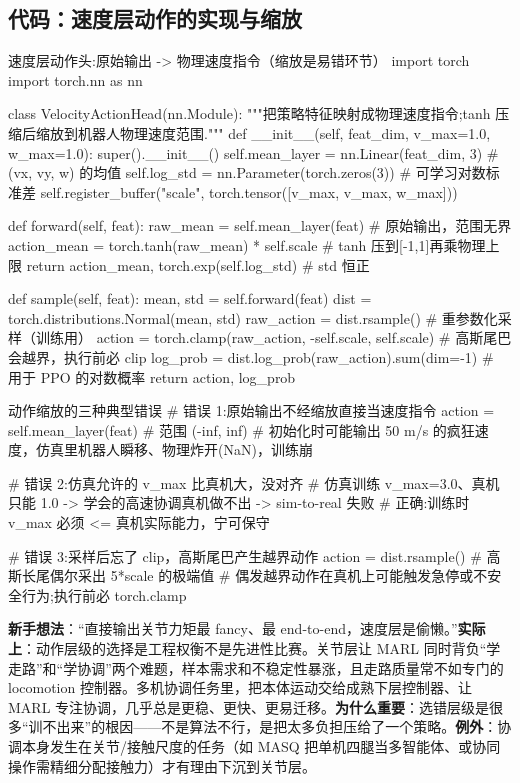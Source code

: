 \subsection{代码：速度层动作的实现与缩放}
\label{sec:mc-action-code}

\begin{codebox}[Python]{速度层动作头:原始输出 -> 物理速度指令（缩放是易错环节）}
import torch
import torch.nn as nn

class VelocityActionHead(nn.Module):
    """把策略特征映射成物理速度指令;tanh 压缩后缩放到机器人物理速度范围."""
    def __init__(self, feat_dim, v_max=1.0, w_max=1.0):
        super().__init__()
        self.mean_layer = nn.Linear(feat_dim, 3)             # (vx, vy, w) 的均值
        self.log_std = nn.Parameter(torch.zeros(3))          # 可学习对数标准差
        self.register_buffer("scale", torch.tensor([v_max, v_max, w_max]))

    def forward(self, feat):
        raw_mean = self.mean_layer(feat)                     # 原始输出，范围无界
        action_mean = torch.tanh(raw_mean) * self.scale      # tanh 压到[-1,1]再乘物理上限
        return action_mean, torch.exp(self.log_std)          # std 恒正

    def sample(self, feat):
        mean, std = self.forward(feat)
        dist = torch.distributions.Normal(mean, std)
        raw_action = dist.rsample()                           # 重参数化采样（训练用）
        action = torch.clamp(raw_action, -self.scale, self.scale)  # 高斯尾巴会越界，执行前必 clip
        log_prob = dist.log_prob(raw_action).sum(dim=-1)     # 用于 PPO 的对数概率
        return action, log_prob
\end{codebox}

\begin{codebox}[Python]{动作缩放的三种典型错误}
# 错误 1:原始输出不经缩放直接当速度指令
action = self.mean_layer(feat)        # 范围 (-inf, inf)
#   初始化时可能输出 50 m/s 的疯狂速度，仿真里机器人瞬移、物理炸开(NaN)，训练崩

# 错误 2:仿真允许的 v_max 比真机大，没对齐
#   仿真训练 v_max=3.0、真机只能 1.0 -> 学会的高速协调真机做不出 -> sim-to-real 失败
#   正确:训练时 v_max 必须 <= 真机实际能力，宁可保守

# 错误 3:采样后忘了 clip，高斯尾巴产生越界动作
action = dist.rsample()               # 高斯长尾偶尔采出 5*scale 的极端值
#   偶发越界动作在真机上可能触发急停或不安全行为;执行前必 torch.clamp
\end{codebox}

\begin{pitfall}
\textbf{新手想法}：“直接输出关节力矩最 fancy、最 end-to-end，速度层是偷懒。”\textbf{实际上}：动作层级的选择是工程权衡不是先进性比赛。关节层让 MARL 同时背负“学走路”和“学协调”两个难题，样本需求和不稳定性暴涨，且走路质量常不如专门的 locomotion 控制器。多机协调任务里，把本体运动交给成熟下层控制器、让 MARL 专注协调，几乎总是更稳、更快、更易迁移。\textbf{为什么重要}：选错层级是很多“训不出来”的根因——不是算法不行，是把太多负担压给了一个策略。\textbf{例外}：协调本身发生在关节/接触尺度的任务（如 MASQ 把单机四腿当多智能体、或协同操作需精细分配接触力）才有理由下沉到关节层。
\end{pitfall}

